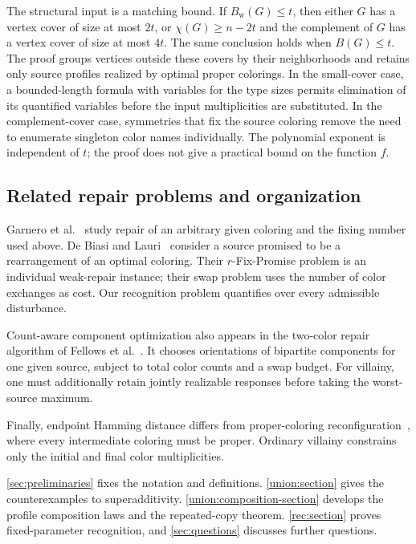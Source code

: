 \documentclass[10pt,a4paper]{amsart}
\numberwithin{equation}{section}
\theoremstyle{definition}
\theoremstyle{remark}
\begin{document}
The structural input is a matching bound. If
$B_{\mathrm w}(G)\le t$, then either $G$ has a vertex cover of size at
most $2t$, or $\chi(G)\ge n-2t$ and the complement of $G$ has a vertex
cover of size at most $4t$. The same conclusion holds when
$B(G)\le t$. The proof groups vertices outside these covers by their
neighborhoods and retains only source profiles realized by optimal
proper colorings.
In the small-cover case, a bounded-length formula with variables for
the type sizes permits elimination of its quantified variables before
the input multiplicities are substituted. In the complement-cover
case, symmetries that fix the source coloring remove the need to
enumerate singleton color names individually.
The polynomial exponent is independent of $t$; the proof does not
give a practical bound on the function $f$.

\subsection{Related repair problems and organization}

Garnero et al.~\cite{garnero2018} study repair of an arbitrary given
coloring and the fixing number used above. De Biasi and
Lauri~\cite{debiasi2019} consider a source promised to be a
rearrangement of an optimal coloring. Their $r$-Fix-Promise problem
is an individual weak-repair instance; their swap problem uses the
number of color exchanges as cost. Our recognition problem
quantifies over every admissible disturbance.

Count-aware component optimization also appears in the two-color
repair algorithm of Fellows et al.~\cite{fellows2026}. It chooses
orientations of bipartite components for one given source, subject
to total color counts and a swap budget. For villainy, one must additionally retain jointly realizable
responses before taking the worst-source maximum.

Finally, endpoint Hamming distance differs from proper-coloring
reconfiguration~\cite{Bousquet2024,fuchs2025}, where every intermediate
coloring must be proper. Ordinary villainy constrains only the initial
and final color multiplicities.

\cref{sec:preliminaries} fixes the notation and definitions.
\cref{union:section} gives the counterexamples to
superadditivity. \cref{union:composition-section} develops the
profile composition laws and the repeated-copy theorem.
\cref{rec:section} proves fixed-parameter recognition, and
\cref{sec:questions} discusses further questions.
\end{document}
